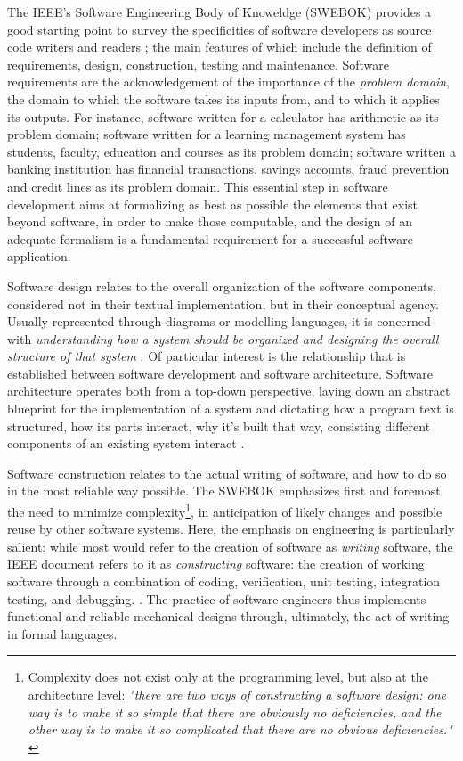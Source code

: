 The IEEE's Software Engineering Body of Knoweldge (SWEBOK) provides a good starting point to survey the specificities of software developers as source code writers and readers \citep{bourque_swebok_2014}; the main features of which include the definition of requirements, design, construction, testing and maintenance. Software requirements are the acknowledgement of the importance of the \emph{problem domain}, the domain to which the software takes its inputs from, and to which it applies its outputs. For instance, software written for a calculator has arithmetic as its problem domain; software written for a learning management system has students, faculty, education and courses as its problem domain; software written a banking institution has financial transactions, savings accounts, fraud prevention and credit lines as its problem domain. This essential step in software development aims at formalizing as best as possible the elements that exist beyond software, in order to make those computable, and the design of an adequate formalism is a fundamental requirement for a successful software application.

Software design relates to the overall organization of the software components, considered not in their textual implementation, but in their conceptual agency. Usually represented through diagrams or modelling languages, it is concerned with \emph{understanding how a system should be organized and designing the overall structure of that system} \citep{sommerville_software_2010}. Of particular interest is the relationship that is established between software development and software architecture. Software architecture operates both from a top-down perspective, laying down an abstract blueprint for the implementation of a system and dictating how a program text is structured, how its parts interact, why it's built that way, consisting different components of an existing system interact \citep{brown_introduction_2011}.

Software construction relates to the actual writing of software, and how to do so in the most reliable way possible. The SWEBOK emphasizes first and foremost the need to minimize complexity\footnote{Complexity does not exist only at the programming level, but also at the architecture level: \emph{"there are two ways of constructing a software design: one way is to make it so simple that there are obviously no deficiencies, and the other way is to make it so complicated that there are no obvious deficiencies."} \citep{hoare_emperor_1981}}, in anticipation of likely changes and possible reuse by other software systems. Here, the emphasis on engineering is particularly salient: while most would refer to the creation of software as \emph{writing} software, the IEEE document refers to it as \emph{constructing} software: the creation of working software through a combination of coding, verification, unit testing, integration testing, and debugging. \citep{bourque_swebok_2014}. The practice of software engineers thus implements functional and reliable mechanical designs through, ultimately, the act of writing in formal languages.

